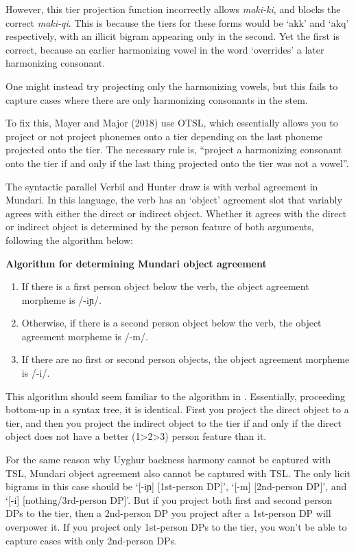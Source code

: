 However, this tier projection function incorrectly allows \textit{maki-ki}, and blocks the correct \textit{maki-qi}. This is because the tiers for these forms would be `akk' and `akq' respectively, with an illicit bigram appearing only in the second. Yet the first is correct, because an earlier harmonizing vowel in the word `overrides' a later harmonizing consonant.

One might instead try projecting only the harmonizing vowels, but this fails to capture cases where there are only harmonizing consonants in the stem.

To fix this, Mayer and Major (2018) use OTSL, which essentially allows you to project or not project phonemes onto a tier depending on the last phoneme projected onto the tier. The necessary rule is, ``project a harmonizing consonant onto the tier if and only if the last thing projected onto the tier was not a vowel''.

The syntactic parallel Verbil and Hunter draw is with verbal agreement in Mundari. In this language, the verb has an `object' agreement slot that variably agrees with either the direct or indirect object. Whether it agrees with the direct or indirect object is determined by the person feature of both arguments, following the algorithm below:

\ex \textbf{Algorithm for determining Mundari object agreement}
\begin{enumerate}
    \item If there is a first person object below the verb, the object agreement morpheme is /-iɲ/.
    \item Otherwise, if there is a second person object below the verb, the object agreement morpheme is /-m/.
    \item If there are no first or second person objects, the object agreement morpheme is /-i/.
\end{enumerate}
\xe

This algorithm should seem familiar to the algorithm in \LLast. Essentially, proceeding bottom-up in a syntax tree, it is identical. First you project the direct object to a tier, and then you project the indirect object to the tier if and only if the direct object does not have a better (1>2>3) person feature than it.

For the same reason why Uyghur backness harmony cannot be captured with TSL, Mundari object agreement also cannot be captured with TSL. The only licit bigrams in this case should be `[-iɲ] [1st-person DP]', `[-m] [2nd-person DP]', and `[-i] [nothing/3rd-person DP]'. But if you project both first and second person DPs to the tier, then a 2nd-person DP you project after a 1st-person DP will overpower it. If you project only 1st-person DPs to the tier, you won't be able to capture cases with only 2nd-person DPs.

